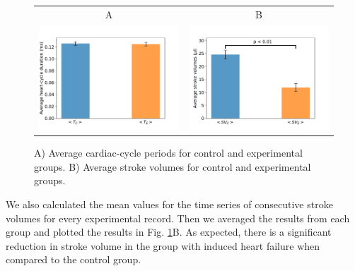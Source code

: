 \documentclass[%
preprint,
 amsmath,amssymb,
 aps,
]{revtex4-2}
\begin{document}
\begin{figure}[h!]
    \begin{tabular}{cc}
        A & B \\
        \includegraphics[width=3in]{Fig01_A.pdf} &
        \includegraphics[width=3in]{Fig01_B.pdf}
    \end{tabular}
    \caption{A) Average cardiac-cycle periods for control and experimental groups. B) Average stroke volumes for control and experimental groups.}
    \label{fig:fig01}
\end{figure}

We also calculated the mean values for the time series of consecutive stroke volumes for every experimental record. Then we averaged the results from each group and plotted the results in Fig. \ref{fig:fig01}B. As expected, there is a significant reduction in stroke volume in the group with induced heart failure when compared to the control group.
\end{document}
